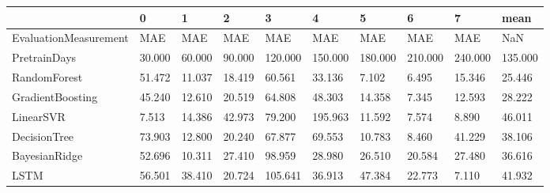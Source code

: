 \begin{tabular}{llllllllll}
\toprule
{} &      0 &      1 &      2 &       3 &       4 &       5 &       6 &       7 &    mean \\
\midrule
EvaluationMeasurement &    MAE &    MAE &    MAE &     MAE &     MAE &     MAE &     MAE &     MAE &     NaN \\
PretrainDays          & 30.000 & 60.000 & 90.000 & 120.000 & 150.000 & 180.000 & 210.000 & 240.000 & 135.000 \\
RandomForest          & 51.472 & 11.037 & 18.419 &  60.561 &  33.136 &   7.102 &   6.495 &  15.346 &  25.446 \\
GradientBoosting      & 45.240 & 12.610 & 20.519 &  64.808 &  48.303 &  14.358 &   7.345 &  12.593 &  28.222 \\
LinearSVR             &  7.513 & 14.386 & 42.973 &  79.200 & 195.963 &  11.592 &   7.574 &   8.890 &  46.011 \\
DecisionTree          & 73.903 & 12.800 & 20.240 &  67.877 &  69.553 &  10.783 &   8.460 &  41.229 &  38.106 \\
BayesianRidge         & 52.696 & 10.311 & 27.410 &  98.959 &  28.980 &  26.510 &  20.584 &  27.480 &  36.616 \\
LSTM                  & 56.501 & 38.410 & 20.724 & 105.641 &  36.913 &  47.384 &  22.773 &   7.110 &  41.932 \\
\bottomrule
\end{tabular}
